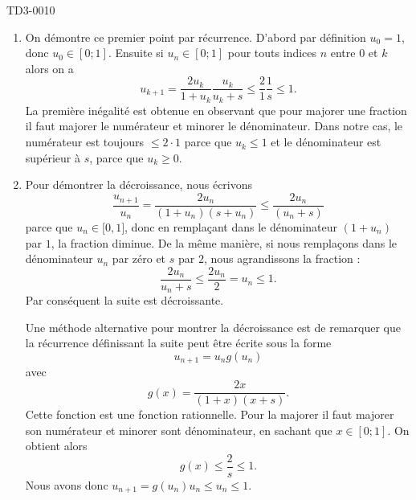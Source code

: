 


\begin{corrige}{TD3-0010}
  

  \begin{enumerate}
  \item 
      On démontre ce premier point par récurrence. D'abord par définition $u_0=1$, donc $u_0\in[0;1]$. Ensuite si $u_n\in[0;1]$ pour touts indices $n$ entre $0$ et $k$ alors on a 
            \[
            u_{k+1}=\frac{2u_k}{1+u_k}\frac{u_k}{u_k+s}\leq\frac{2}{1}\frac{1}{s}\leq 1.
            \] 
            La première inégalité est obtenue en observant que pour majorer une fraction il faut majorer le numérateur et minorer le dénominateur. Dans notre cas, le numérateur est toujours $\leq 2 \cdot 1$ parce que $u_k\leq 1$ et le dénominateur est supérieur à $s$, parce que $u_k\geq 0$.

    \item 
        
        Pour démontrer la décroissance, nous écrivons
        \begin{equation}
            \frac{ u_{n+1} }{ u_n }=\frac{ 2u_n }{ (1+u_n)(s+u_n) }\leq \frac{ 2u_n }{ (u_n+s) }
        \end{equation}
        parce que \( u_n\in\mathopen[ 0 , 1 \mathclose]\), donc en remplaçant dans le dénominateur \( (1+u_n)\) par \( 1\), la fraction diminue. De la même manière, si nous remplaçons dans le dénominateur \( u_n\) par zéro et \( s\) par \( 2\), nous agrandissons la fraction :
        \begin{equation}
            \frac{ 2u_n }{ u_n+s }\leq \frac{ 2u_n }{ 2 }=u_n\leq 1.
        \end{equation}
        Par conséquent la suite est décroissante.
        
        Une méthode alternative pour montrer la décroissance est de remarquer que la récurrence définissant la suite peut être écrite sous la forme
        \begin{equation}
            u_{n+1}=u_ng(u_n)
        \end{equation}
        avec
        \begin{equation}
            g(x)=\frac{2x}{(1+x)(x+s)}.
        \end{equation}
        Cette fonction est une fonction rationnelle. Pour la majorer il faut majorer son numérateur et minorer sont dénominateur, en sachant que $x\in[0;1]$. On obtient alors 
        \begin{equation}
            g(x)\leq \frac{2}{s}\leq 1.
        \end{equation}
        Nous avons donc \( u_{n+1}=g(u_n)u_n\leq u_n\leq 1\).


\end{enumerate}
\end{corrige}

